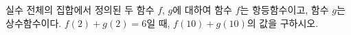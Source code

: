 실수 전체의 집합에서 정의된 두 함수 $f$, $g$에 대하여 함수 $f$는 항등함수이고, 함수 $g$는 상수함수이다. $f(2)+g(2)=6$일 때, $f(10)+g(10)$의 값을 구하시오.
